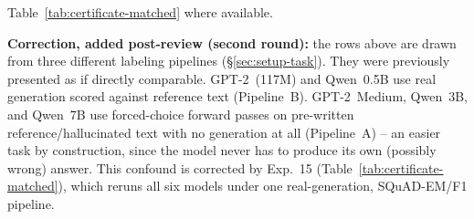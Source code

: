 \documentclass[10pt,twocolumn]{article}
\begin{document}
\begin{table}[!htbp]
{  Table~\ref{tab:certificate-matched} where available.}
\label{tab:certificate}
\small
\setlength{\tabcolsep}{3pt}
\end{table}

\textbf{Correction, added post-review (second round):} the rows above
are drawn from three different labeling pipelines
(\S\ref{sec:setup-task}). They were previously presented as if directly
comparable. GPT-2~(117M) and Qwen~0.5B use real generation scored
against reference text (Pipeline~B). GPT-2~Medium, Qwen~3B, and
Qwen~7B use forced-choice forward passes on pre-written
reference/hallucinated text with no generation at all (Pipeline~A) --
an easier task by construction, since the model never has to produce
its own (possibly wrong) answer. This confound is corrected by Exp.~15
(Table~\ref{tab:certificate-matched}), which reruns all six models
under one real-generation, SQuAD-EM/F1 pipeline.
\end{document}
